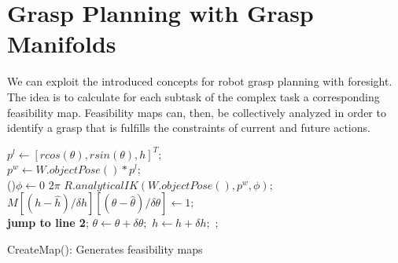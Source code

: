 \documentclass{aamas2015}
\begin{document}
%


\section{Grasp Planning with Grasp Manifolds}
We can exploit the introduced concepts for robot grasp planning
with foresight. The idea is to calculate for each subtask of the
complex task a corresponding feasibility map. Feasibility
maps can, then, be collectively analyzed in order to identify
a grasp that is fulfills the constraints of current and future actions.


\begin{algorithm}[ht!]
   {
    \For{$\theta \leftarrow \hat{\theta}$ \KwTo $\check{\theta}$} {
      $p^l \leftarrow [r cos(\theta), r sin(\theta), h]^T;$ \\
      $p^w \leftarrow W.objectPose() * p^l$;  \\
      \For(){$\phi \leftarrow 0$ \KwTo $2 \pi$} {
	$R.analyticalIK(W.objectPose(), p^w, \phi);$ \\
	 {
	  $M[(h-\hat{h})/\delta h][(\theta-\hat{\theta})/\delta \theta] \leftarrow 1;$ \\
	  \textbf{jump to line 2};
	}
      }
      $\theta \leftarrow \theta + \delta \theta;$
    }
    $h \leftarrow h + \delta h;$
  }
  ; 
  \caption{CreateMap(): Generates feasibility maps}
\end{algorithm}
\end{document}
